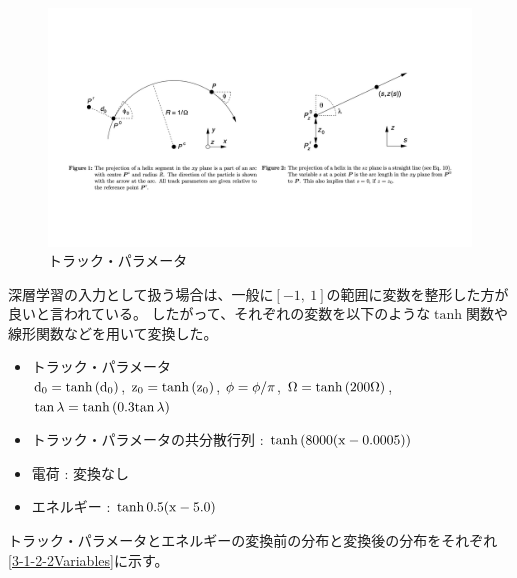 \begin{figure}[h]
 \centering
 \includegraphics[trim = 0 150 0 150, width=1.0\textwidth]{Figure/3Networks/3-1-2-1TrackParameters.png}
 \caption{トラック・パラメータ\cite{TrackParametersLCIO}}
 \label{3-1-2-1TrackParameters}
\end{figure}

深層学習の入力として扱う場合は、一般に$[-1,\ 1]$の範囲に変数を整形した方が良いと言われている。
したがって、それぞれの変数を以下のような$\tanh$関数や線形関数などを用いて変換した。

\begin{itemize}
 \item トラック・パラメータ\\
 ${\rm d_0} = \tanh{({\rm d_0})}$,
 ${\rm z_0} = \tanh{({\rm z_0})}$,
 ${\rm \phi} = {\rm \phi}/\pi$,
 ${\rm \Omega} = \tanh{(200{\rm \Omega})}$,
 ${\rm \tan{\lambda}} = \tanh{(0.3{\rm \tan{\lambda}})}$
 \item トラック・パラメータの共分散行列 : $\tanh{(8000({\rm x}-0.0005))}$
 \item 電荷 : 変換なし
 \item エネルギー : $\tanh{0.5({\rm x}-5.0)}$
\end{itemize}

トラック・パラメータとエネルギーの変換前の分布と変換後の分布をそれぞれ\ref{3-1-2-2Variables}に示す。

